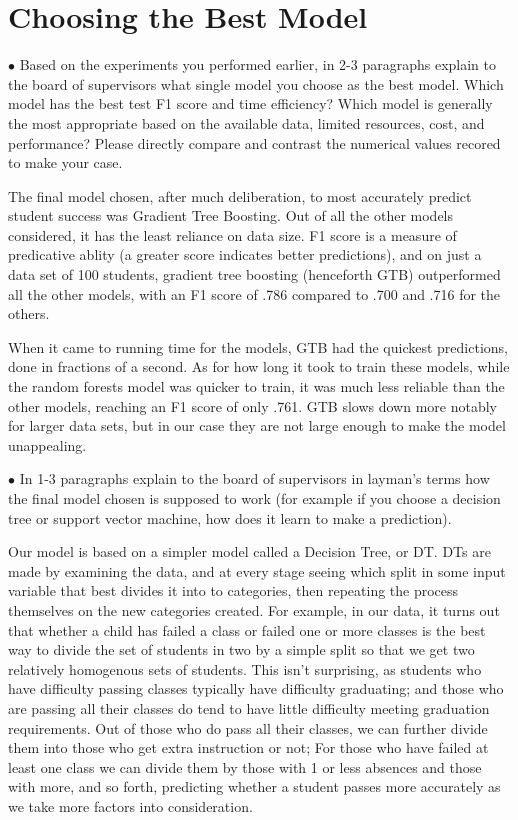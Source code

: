 \documentclass{amsart}
\begin{document}
\section{Choosing the Best Model}

\begin{list}{}{\addtolength{\parsep}{1mm}}
\item[$\bullet$] Based on the experiments you performed earlier, in 2-3 paragraphs explain to the board of supervisors what single model you choose as the best model. Which model has the best test F1 score and time efficiency? Which model is generally the most appropriate based on the available data, limited resources, cost, and performance? Please directly compare and contrast the numerical values recored to make your case.

The final model chosen, after much deliberation, to most accurately predict student success was Gradient Tree Boosting.  Out of all the other models considered, it has the least reliance on data size.  F1 score is a measure of predicative ablity (a greater score indicates better predictions), and on just a data set of 100 students, gradient tree boosting (henceforth GTB) outperformed all the other models, with an F1 score of .786 compared to .700 and .716 for the others.

When it came to running time for the models, GTB had the quickest predictions, done in fractions of a second.  As for how long it took to train these models, while the random forests model was quicker to train, it was much less reliable than the other models, reaching an F1 score of only .761.  GTB slows down more notably for larger data sets, but in our case they are not large enough to make the model unappealing.

\item[$\bullet$] In 1-3 paragraphs explain to the board of supervisors in layman's terms how the final model chosen is supposed to work (for example if you choose a decision tree or support vector machine, how does it learn to make a prediction).

Our model is based on a simpler model called a Decision Tree, or DT.  DTs are made by examining the data, and at every stage seeing which split in some input variable that best divides it into to categories, then repeating the process themselves on the new categories created.  For example, in our data, it turns out that whether a child has failed a class or failed one or more classes is the best way to divide the set of students in two by a simple split so that we get two relatively homogenous sets of students.  This isn't surprising, as students who have difficulty passing classes typically have difficulty graduating; and those who are passing all their classes do tend to have little difficulty meeting graduation requirements.  Out of those who do pass all their classes, we can further divide them into those who get extra instruction or not; For those who have failed at least one class we can divide them by those with 1 or less absences and those with more, and so forth, predicting whether a student passes more accurately as we take more factors into consideration. 


\end{list}
\end{document}
